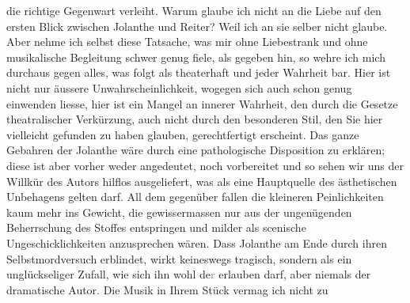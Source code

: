                die richtige Gegenwart verleiht. Warum glaube ich nicht an die Liebe auf den ersten
               Blick zwischen Jolanthe und
                  Reiter? Weil ich an sie
               selber nicht glaube. Aber nehme ich selbst diese Tatsache, was mir ohne Liebestrank
               und ohne musikalische Begleitung schwer genug fiele, als gegeben hin, so wehre ich
               mich durchaus gegen alles, was folgt als theaterhaft {\pb}und jeder Wahrheit bar. Hier ist nicht nur
               äussere Unwahrscheinlichkeit, wogegen sich auch schon genug einwenden liesse, hier
               ist ein Mangel an innerer Wahrheit, den durch die Gesetze theatralischer Verkürzung,
               auch nicht durch den besonderen Stil, den Sie hier vielleicht gefunden zu haben
               glauben, gerechtfertigt erscheint. Das ganze Gebahren der Jolanthe wäre durch eine pathologische
               Disposition zu erklären; diese ist aber vorher weder angedeutet, noch vorbereitet und
               so sehen wir uns der Willkür des Autors hilflos ausgeliefert, was als eine
               Hauptquelle des ästhetischen Unbehagens gelten darf. All dem gegenüber fallen die
               kleineren Peinlichkeiten kaum mehr ins Gewicht, die gewissermassen nur aus der
               ungenügenden Beherrschung des Stoffes entspringen und milder als scenische
               Ungeschicklichkeiten anzusprechen wären. Dass Jolanthe am Ende durch ihren Selbstmordversuch erblindet,
               wirkt keineswegs tragisch, sondern als ein unglück{\pb}seliger Zufall, wie sich ihn wohl
                  de\textcolor{gray}{r}{ } erlauben darf, aber niemals der dramatische Autor. Die Musik in Ihrem Stück vermag ich nicht zu
